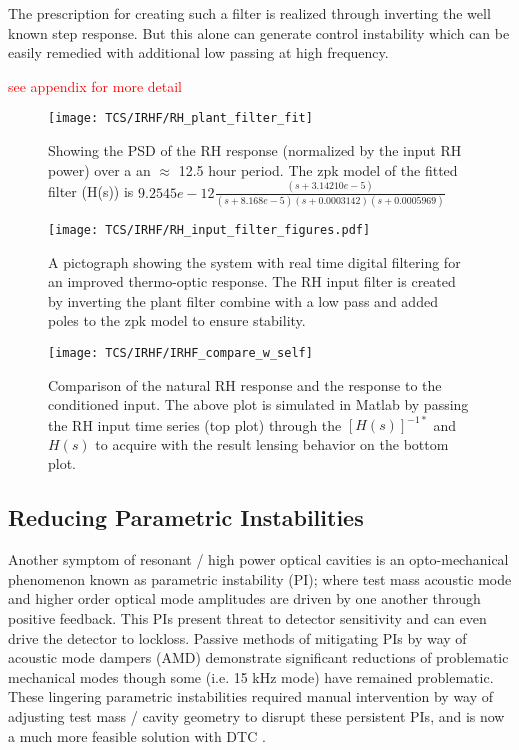 The prescription for creating such a filter is realized through inverting the well known step response. But this alone can generate control instability which can be easily remedied with additional low passing at high frequency.

\textcolor{red}{see appendix for more detail}

\begin{figure}[H]
\texttt{[image: TCS/IRHF/RH\_plant\_filter\_fit]}
\caption{Showing the PSD of the RH response (normalized by the input RH power) over a an $\approx$ 12.5 hour period. The zpk model of the fitted filter (H(s)) is $9.2545e-12 \frac{(s+3.14210e-5)}{(s+8.168e-5)(s+0.0003142)(s+0.0005969)}$}
\label{fig:plant_v_fit}
\end{figure}

\begin{figure}[H]
\centering
\texttt{[image: TCS/IRHF/RH\_input\_filter\_figures.pdf]}
\caption{A pictograph showing the system with real time digital filtering for an improved thermo-optic response. The RH input filter is created by inverting the plant filter combine with a low pass and added poles to the zpk model to ensure stability.}
\label{fig:rtdf_pictograph}
\end{figure}

\begin{figure}[H]
\texttt{[image: TCS/IRHF/IRHF\_compare\_w\_self]}
\caption{Comparison of the natural RH response and the response to the conditioned input. The above plot is simulated in Matlab by passing the RH input time series (top plot) through the $[H(s)]^{-1*}$ and $H(s)$ to acquire with the result lensing behavior on the bottom plot.}
\label{fig:dynam_comparison}
\end{figure}
\newpage

\subsection{Reducing Parametric Instabilities}
Another symptom of resonant / high power optical cavities is an opto-mechanical phenomenon known as parametric instability (PI); where test mass acoustic mode and higher order optical mode amplitudes are driven by one another through positive feedback. This PIs present threat to detector sensitivity and can even drive the detector to lockloss. Passive methods of mitigating PIs by way of acoustic mode dampers (AMD) demonstrate significant reductions of problematic mechanical modes though some (i.e. 15 kHz mode) have remained problematic. These lingering parametric instabilities required manual intervention by way of adjusting test mass / cavity geometry to disrupt these persistent PIs, and is now a much more feasible solution with DTC \cite{Hardwick_2020}.  

